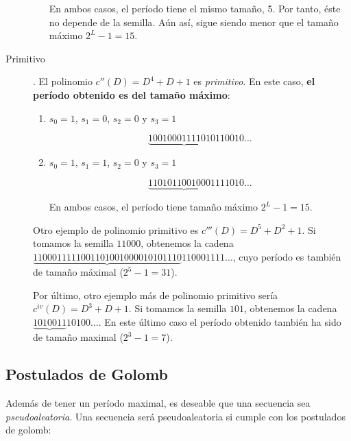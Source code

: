 \documentclass[10pt,spanish]{article}
\begin{document}
\begin{description}
\begin{enumerate}
        En ambos casos, el período tiene el mismo tamaño, 5. Por tanto, éste no depende de la semilla. Aún así, sigue siendo menor que el tamaño máximo $2^L - 1 = 15$.
    \end{enumerate}

    \item[Primitivo]. El polinomio $c''(D) = D^4 + D + 1$ es \textit{\textcolor{azul}{primitivo}}. En este caso, \textbf{\textcolor{azul}{el período obtenido es del tamaño máximo}}:

    \begin{enumerate}
        \item $s_0 = 1$, $s_1 = 0$, $s_2 = 0$ y $s_3 = 1$

        \begin{displaymath}
            \underbrace{100100011110101}10010\ldots
        \end{displaymath}

        \item $s_0 = 1$, $s_1 = 1$, $s_2 = 0$ y $s_3 = 1$

        \begin{displaymath}
            \underbrace{110101100100011}11010\ldots
        \end{displaymath}

        En ambos casos, el período tiene tamaño máximo $2^L - 1 = 15$.
    \end{enumerate}

    Otro ejemplo de polinomio primitivo es $c'''(D) = D^5 + D^2 + 1$. Si tomamos la semilla $11000$, obtenemos la cadena $\underbrace{1100011111001101001000010101110}110001111\ldots$, cuyo período es también de tamaño máximal ($2^5 - 1 = 31$).

    Por último, otro ejemplo más de polinomio primitivo sería $c^{iv}(D) = D^3 + D + 1$. Si tomamos la semilla $101$, obtenemos la cadena $\underbrace{1010011}10100\ldots$. En este último caso el período obtenido también ha sido de tamaño maximal ($2^3 - 1 = 7$).
\end{description}

\subsection{\textcolor{azul}Postulados de Golomb}
Además de tener un período maximal, es deseable que una secuencia sea \textit{\textcolor{azul}{pseudoaleatoria}}. Una secuencia será pseudoaleatoria si cumple con los postulados de golomb:
\end{document}
